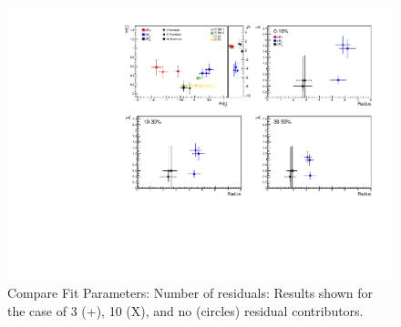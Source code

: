 \documentclass[../AnalysisNoteJBuxton.tex]{subfiles}
\begin{document}
\begin{figure}[h]
  \centering
  \includegraphics[width=\textwidth]{7_ResultsAndDiscussion/Figures/CompareAllScattParams_CompNumRes_StatOnly.pdf}
  \caption[Compare Fit Parameters: Number of residuals]{Compare Fit Parameters: Number of residuals: Results shown for the case of 3 (+), 10 (X), and no (circles) residual contributors.}
  \label{fig:CompareAllScattParams_CompNumRes}
\end{figure}
\end{document}
